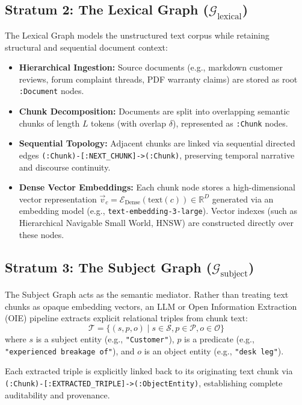 \documentclass[10pt,twocolumn,letterpaper]{article}
\begin{document}
\subsection{Stratum 2: The Lexical Graph ($\mathcal{G}_{\text{lexical}}$)}
The Lexical Graph models the unstructured text corpus while retaining structural and sequential document context:
\begin{itemize}
    \item \textbf{Hierarchical Ingestion:} Source documents (e.g., markdown customer reviews, forum complaint threads, PDF warranty claims) are stored as root \texttt{:Document} nodes.
    \item \textbf{Chunk Decomposition:} Documents are split into overlapping semantic chunks of length $L$ tokens (with overlap $\delta$), represented as \texttt{:Chunk} nodes.
    \item \textbf{Sequential Topology:} Adjacent chunks are linked via sequential directed edges \texttt{(:Chunk)-[:NEXT\_CHUNK]->(:Chunk)}, preserving temporal narrative and discourse continuity.
    \item \textbf{Dense Vector Embeddings:} Each chunk node stores a high-dimensional vector representation $\vec{v}_c = \mathcal{E}_{\text{Dense}}(\text{text}(c)) \in \mathbb{R}^D$ generated via an embedding model (e.g., \texttt{text-embedding-3-large}). Vector indexes (such as Hierarchical Navigable Small World, HNSW) are constructed directly over these nodes.
\end{itemize}

\subsection{Stratum 3: The Subject Graph ($\mathcal{G}_{\text{subject}}$)}
The Subject Graph acts as the semantic mediator. Rather than treating text chunks as opaque embedding vectors, an LLM or Open Information Extraction (OIE) pipeline extracts explicit relational triples from chunk text:
\begin{equation}
\mathcal{T} = \{ (s, p, o) \mid s \in \mathcal{S}, p \in \mathcal{P}, o \in \mathcal{O} \}
\end{equation}
where $s$ is a subject entity (e.g., \texttt{"Customer"}), $p$ is a predicate (e.g., \texttt{"experienced breakage of"}), and $o$ is an object entity (e.g., \texttt{"desk leg"}).

Each extracted triple is explicitly linked back to its originating text chunk via \texttt{(:Chunk)-[:EXTRACTED\_TRIPLE]->(:ObjectEntity)}, establishing complete auditability and provenance.
\end{document}
